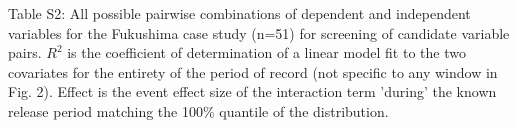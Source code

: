 \documentclass{article}
\begin{document}


\noindent Table S2: All possible pairwise combinations of dependent and independent variables for the Fukushima case study (n=51) for screening of candidate variable pairs. $R^2$ is the coefficient of determination of a linear model fit to the two covariates for the entirety of the period of record (not specific to any window in Fig. 2). Effect is the event effect size of the interaction term 'during' the known release period matching the 100\% quantile of the distribution.




\end{document}
